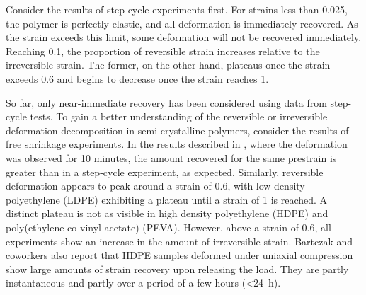 Consider the results of step-cycle experiments first.
For strains less than 0.025, the polymer is perfectly elastic, and all deformation is immediately recovered.
As the strain exceeds this limit, some deformation will not be recovered immediately.
Reaching 0.1, the proportion of reversible strain increases relative to the irreversible strain.
The former, on the other hand, plateaus once the strain exceeds 0.6 and begins to decrease once the strain reaches 1.

So far, only near-immediate recovery has been considered using data from step-cycle tests.
To gain a better understanding of the reversible or irreversible deformation decomposition in semi-crystalline polymers, consider the results of free shrinkage experiments.
In the results described in \cite{hissNetworkStretchingSlip1999}, where the deformation was observed for 10 minutes, the amount recovered for the same prestrain is greater than in a step-cycle experiment, as expected.
Similarly, reversible deformation appears to peak around a strain of 0.6, with low-density polyethylene (LDPE) exhibiting a plateau until a strain of 1 is reached.
A distinct plateau is not as visible in high density polyethylene (HDPE) and poly(ethylene-co-vinyl acetate) (PEVA).
However, above a strain of 0.6, all experiments show an increase in the amount of irreversible strain.
Bartczak and coworkers \citep{bartczakEvolutionCrystallineTexture1992} also report that HDPE samples deformed under uniaxial compression show large amounts of strain recovery upon releasing the load.
They are partly instantaneous and partly over a period of a few hours (<\SI{24}{\hour}).

